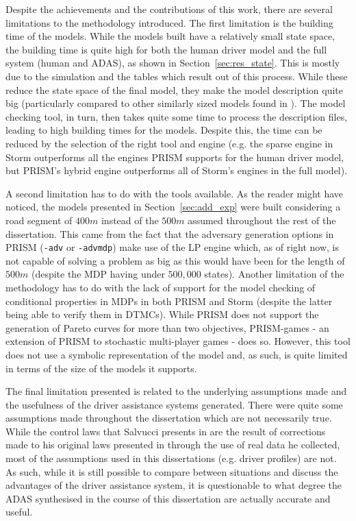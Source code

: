 Despite the achievements and the contributions of this work, there are several limitations to the methodology introduced. The first limitation is the building time of the models. While the models built have a relatively small state space, the building time is quite high for both the human driver model and the full system (human and ADAS), as shown in Section~\ref{sec:res_state}. This is mostly due to the simulation and the tables which result out of this process. While these reduce the state space of the final model, they make the model description quite big (particularly compared to other similarly sized models found in \cite{lam, games}). The model checking tool, in turn, then takes quite some time to process the description files, leading to high building times for the models. Despite this, the time can be reduced by the selection of the right tool and engine (e.g. the sparse engine in Storm outperforms all the engines PRISM supports for the human driver model, but PRISM's hybrid engine outperforms all of Storm's engines in the full model). 

A second limitation has to do with the tools available. As the reader might have noticed, the models presented in Section~\ref{sec:add_exp} were built considering a road segment of $400m$ instead of the $500m$ assumed throughout the rest of the dissertation. This came from the fact that the adversary generation options in PRISM (\texttt{-adv} or \texttt{-advmdp}) make use of the LP engine which, as of right now, is not capable of solving a problem as big as this would have been for the length of $500m$ (despite the MDP having under $500,000$ states). Another limitation of the methodology has to do with the lack of support for the model checking of conditional properties in MDPs in both PRISM and Storm (despite the latter being able to verify them in DTMCs). While PRISM does not support the generation of Pareto curves for more than two objectives, PRISM-games - an extension of PRISM to stochastic multi-player games \cite{prism_games} - does so. However, this tool does not use a symbolic representation of the model and, as such, is quite limited in terms of the size of the models it supports.

The final limitation presented is related to the underlying assumptions made and the usefulness of the driver assistance systems generated. There were quite some assumptions made throughout the dissertation which are not necessarily true. While the control laws that Salvucci presents in \cite{salvucci_1} are the result of corrections made to his original laws presented in \cite{salvucci_0} through the use of real data he collected, most of the assumptions used in this dissertations (e.g. driver profiles) are not. As such, while it is still possible to compare between situations and discuss the advantages of the driver assistance system, it is questionable to what degree the ADAS synthesised in the course of this dissertation are actually accurate and useful. 

